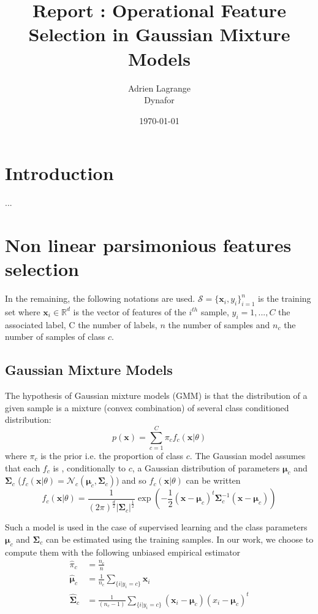 \documentclass[a4paper]{article}
\title{Report : Operational Feature Selection in Gaussian Mixture Models}
\author{Adrien Lagrange
\\
\small{Dynafor}}
\date{\today}
\begin{document}
\maketitle

\section{Introduction}

...





\section{Non linear parsimonious features selection}

In the remaining, the following notations are used. $\mathcal{S} = \{\mathbf{x}_i,y_i\}_{i=1}^{n}$ is the training set where $\mathbf{x}_i \in \mathbb{R}^d$ is the vector of features of the $i^{th}$ sample, $y_i = 1,...,C$ the associated label, C the number of labels, $n$ the number of samples and $n_c$ the number of samples of class $c$.

    \subsection{Gaussian Mixture Models}

    The hypothesis of Gaussian mixture models (GMM) is that the distribution of a given sample is a mixture (convex combination) of several class conditioned distribution:
    \begin{equation}
        p(\mathbf{x}) = \sum_{c=1}^{C} \pi_c f_c(\mathbf{x}|\theta)
    \end{equation}
    where $\pi_c$ is the prior i.e. the proportion of class $c$.
    The Gaussian model assumes that each $f_c$ is , conditionally to $c$, a Gaussian distribution of parameters $\boldsymbol{\mu}_c$ and $\boldsymbol{\Sigma}_c$ ($f_c(\mathbf{x}|\theta) = \mathcal{N}_c(\boldsymbol{\mu}_c, \boldsymbol{\Sigma}_c)$) and so $f_c(\mathbf{x}|\theta)$ can be written
    \begin{equation*}
        f_c(\mathbf{x}|\theta) = \frac{1}{(2\pi)^{\frac{d}{2}} |\boldsymbol{\Sigma}_c|^{\frac{1}{2}}} \exp \left( -\frac{1}{2} (\mathbf{x} - \boldsymbol{\mu}_c)^t \boldsymbol{\Sigma}_c^{-1} (\mathbf{x} - \boldsymbol{\mu}_c) \right)
    \end{equation*}

    Such a model is used in the case of supervised learning and the class parameters $\boldsymbol{\mu}_c$ and $\boldsymbol{\Sigma}_c$ can be estimated using the training samples. In our work, we choose to compute them with the following unbiased empirical estimator
    \begin{align}
        \hat{\pi}_c &= \frac{n_c}{n}\\
        \hat{\boldsymbol{\mu}}_c &= \frac{1}{n_c} \sum_{\{i|y_i = c\}} \mathbf{x}_i \\
        \hat{\boldsymbol{\Sigma}}_c &= \frac{1}{(n_c - 1)} \sum_{\{i|y_i = c\}} (\mathbf{x}_i - \boldsymbol{\mu}_c) (\boldsymbol{}x_i - \boldsymbol{\mu}_c)^t
    \end{align}
\end{document}

